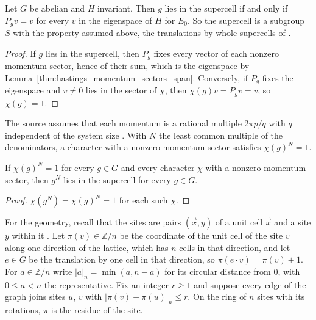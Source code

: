 \begin{lemma}
    \label{thm:hastings_supercell_of_momenta}
    \leanok
    Let $G$ be abelian and $H$ invariant. Then $g$ lies in the supercell if and
    only if $P_gv=v$ for every $v$ in the eigenspace of $H$ for $E_0$. So the
    supercell is a subgroup $S$ with the property assumed above, the
    translations by whole supercells of
    \cite[lines 1626--1630]{Hastings2006Solving}.
\end{lemma}
\begin{proof}\leanok
    If $g$ lies in the supercell, then $P_g$ fixes every vector of each nonzero
    momentum sector, hence of their sum, which is the eigenspace by
    Lemma~\ref{thm:hastings_momentum_sectors_span}. Conversely, if $P_g$ fixes
    the eigenspace and $v\ne0$ lies in the sector of $\chi$, then
    $\chi(g)v=P_gv=v$, so $\chi(g)=1$.
\end{proof}

The source assumes that each momentum is a rational multiple $2\pi p/q$ with
$q$ independent of the system size \cite[lines 1620--1625]{Hastings2006Solving}.
With $N$ the least common multiple of the denominators, a character with a
nonzero momentum sector satisfies $\chi(g)^N=1$.

\begin{lemma}
    \label{thm:hastings_supercell_pow}
    \leanok
    If $\chi(g)^N=1$ for every $g\in G$ and every character $\chi$ with a nonzero
    momentum sector, then $g^N$ lies in the supercell for every $g\in G$.
\end{lemma}
\begin{proof}\leanok
    $\chi(g^N)=\chi(g)^N=1$ for each such $\chi$.
\end{proof}

For the geometry, recall that the sites are pairs $(\vec x,y)$ of a unit cell
$\vec x$ and a site $y$ within it \cite[lines 1607--1612]{Hastings2006Solving}.
Let $\pi(v)\in\mathbb{Z}/n$ be the coordinate of the unit cell of the site $v$
along one direction of the lattice, which has $n$ cells in that direction, and
let $e\in G$ be the translation by one cell in that direction, so
$\pi(e\cdot v)=\pi(v)+1$. For $a\in\mathbb{Z}/n$ write $|a|_n=\min(a,n-a)$
for its circular distance from $0$, with $0\le a<n$ the representative.
Fix an integer $r\ge1$ and suppose every edge of the graph joins sites $u$, $v$
with $|\pi(v)-\pi(u)|_n\le r$. On the ring of $n$ sites with its rotations, $\pi$ is
the residue of the site.

